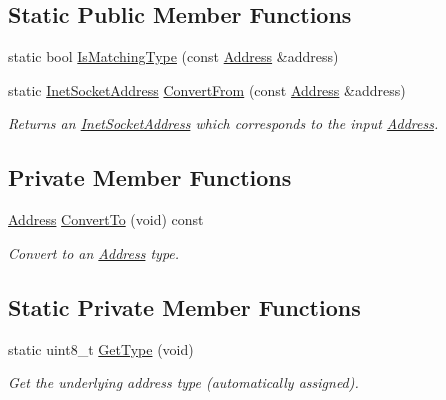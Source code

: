 \subsection*{Static Public Member Functions}
\begin{DoxyCompactItemize}
\item 
static bool \hyperlink{classns3_1_1InetSocketAddress_a9426766e34e928ce5dbdbeb9563a10df}{Is\+Matching\+Type} (const \hyperlink{classns3_1_1Address}{Address} \&address)
\item 
static \hyperlink{classns3_1_1InetSocketAddress}{Inet\+Socket\+Address} \hyperlink{classns3_1_1InetSocketAddress_ade776b1109e7b9a7be0b22ced49931e3}{Convert\+From} (const \hyperlink{classns3_1_1Address}{Address} \&address)
\begin{DoxyCompactList}\small\item\em Returns an \hyperlink{classns3_1_1InetSocketAddress}{Inet\+Socket\+Address} which corresponds to the input \hyperlink{classns3_1_1Address}{Address}. \end{DoxyCompactList}\end{DoxyCompactItemize}
\subsection*{Private Member Functions}
\begin{DoxyCompactItemize}
\item 
\hyperlink{classns3_1_1Address}{Address} \hyperlink{classns3_1_1InetSocketAddress_aff85d38d7b1c421c39f07d5a662a3df3}{Convert\+To} (void) const 
\begin{DoxyCompactList}\small\item\em Convert to an \hyperlink{classns3_1_1Address}{Address} type. \end{DoxyCompactList}\end{DoxyCompactItemize}
\subsection*{Static Private Member Functions}
\begin{DoxyCompactItemize}
\item 
static uint8\+\_\+t \hyperlink{classns3_1_1InetSocketAddress_ae194de8f5f1884e3b755179891d20bba}{Get\+Type} (void)
\begin{DoxyCompactList}\small\item\em Get the underlying address type (automatically assigned). \end{DoxyCompactList}\end{DoxyCompactItemize}
